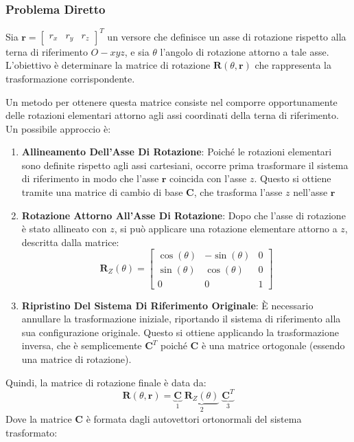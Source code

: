 ﻿\documentclass[11pt, a4paper]{article}
\begin{document}
\subsubsection{Problema Diretto}

Sia \(\mathbf{r} = \begin{bmatrix} r_x & r_y & r_z \end{bmatrix}^{T}\) un versore che definisce un asse di rotazione rispetto alla terna di riferimento \(O{-}xyz\), e sia \(\theta\) l'angolo di rotazione attorno a tale asse. L'obiettivo è determinare la matrice di rotazione \(\mathbf{R}(\theta, \mathbf{r})\) che rappresenta la trasformazione corrispondente.

Un metodo per ottenere questa matrice consiste nel comporre opportunamente delle rotazioni elementari attorno agli assi coordinati della terna di riferimento. Un possibile approccio è:

\begin{enumerate}
    \item \textbf{Allineamento Dell'Asse Di Rotazione}: Poiché le rotazioni elementari sono definite rispetto agli assi cartesiani, occorre prima trasformare il sistema di riferimento in modo che l'asse \(\mathbf{r}\) coincida con l'asse \(z\). Questo si ottiene tramite una matrice di cambio di base \(\mathbf{C}\), che trasforma l'asse \(z\) nell'asse \(\mathbf{r}\)

    \item \textbf{Rotazione Attorno All'Asse Di Rotazione}: Dopo che l'asse di rotazione è stato allineato con \(z\), si può applicare una rotazione elementare attorno a \(z\), descritta dalla matrice:
    \[
       \mathbf{R}_Z(\theta) =
       \begin{bmatrix}
           \cos(\theta) & -\sin(\theta) & 0 \\
           \sin(\theta) &  \cos(\theta) & 0 \\
           0 & 0 & 1
       \end{bmatrix}
    \]

    \item \textbf{Ripristino Del Sistema Di Riferimento Originale}: È necessario annullare la trasformazione iniziale, riportando il sistema di riferimento alla sua configurazione originale. Questo si ottiene applicando la trasformazione inversa, che è semplicemente \(\mathbf{C}^{T}\) poiché \(\mathbf{C}\) è una matrice ortogonale (essendo una matrice di rotazione).
\end{enumerate}
Quindi, la matrice di rotazione finale è data da:
\[
    \mathbf{R}(\theta, \mathbf{r}) = \underbrace{\mathbf{C}}_{1} \; \underbrace{\mathbf{R}_Z(\theta)}_{2} \; \underbrace{\mathbf{C}^{T}}_{3}
\]
Dove la matrice \(\mathbf{C}\) è formata dagli autovettori ortonormali del sistema trasformato:
\end{document}
